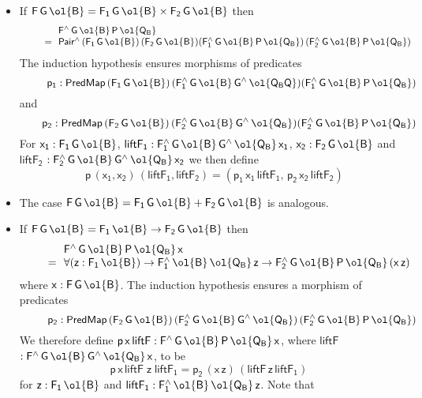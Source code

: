 \documentclass[sigplan,screen]{acmart}
\begin{document}
\begin{itemize}
\item 
If $\mathsf{F\,G\,\ol{B} = F_1\,G\,\ol{B} \times F_2\,G\,\ol{B}}$ then
\[\begin{array}{ll}
& \!\!\mathsf{F^{\wedge}\,G\,\ol{B}\,P\,\ol{Q_B}}\\
\quad\quad= & \!\!\mathsf{Pair^{\wedge}\,(F_1\,G\,\ol{B})\, (F_2\,G\,\ol{B})%
  (F_1^{\wedge}\,G\,\ol{B}\,P\,\ol{Q_B})\,
  (F_2^{\wedge}\,G\,\ol{B}\,P\,\ol{Q_B})}
  \end{array}\] The
induction hypothesis ensures
  morphisms of predicates
  \[\quad\quad\;\;\mathsf{p_1
  : PredMap\,(F_1\,G\,\ol{B})\,(F_1^{\wedge}\,G\,\ol{B}\,G^{\wedge}\,\ol{Q_BQ})
  (F_1^{\wedge}\,G\,\ol{B}\,P\,\ol{Q_B})}\] and \[\quad\quad\mathsf{p_2 :
  PredMap\,(F_2\,G\,\ol{B})\,(F_2^{\wedge}\,G\,\ol{B}\,G^{\wedge}\,\ol{Q_B})
  (F_2^{\wedge}\,G\,\ol{B}\,P\,\ol{Q_B})}\] For $\mathsf{x_1 :
  F_1\,G\,\ol{B}}$, $\mathsf{liftF_1 :
  F_1^{\wedge}\,G\,\ol{B}\,G^{\wedge}\,\ol{Q_B}\,x_1}$, $\mathsf{x_2 :
  F_2\,G\,\ol{B}}$ and $\mathsf{liftF_2}$ $\mathsf{:
  F_2^{\wedge}\,G\,\ol{B}\,G^{\wedge}\,\ol{Q_B}\,x_2}$ we then define
\[\quad\mathsf{p\, (x_1, x_2)\, (liftF_1, liftF_2) =
  (p_1\,x_1\,liftF_1,\, p_2\,x_2\,liftF_2)}\]
\item The case $\mathsf{F\,G\,\ol{B} = F_1\,G\,\ol{B} +
  F_2\,G\,\ol{B}}$ is analogous.
\item If $\mathsf{F\,G\,\ol{B} = F_1\,\ol{B} \to F_2\,G\,\ol{B}}$ then
  \[\begin{array}{ll}
  & \!\!\mathsf{F^{\wedge}\,G\,\ol{B}\,P\,\ol{Q_B}\,x}\\
  \quad\quad= & \!\!\mathsf{\forall (z :
  F_1\,\ol{B}) \to F_1^{\wedge}\,\ol{B}\,\ol{Q_B}\,z \to
  F_2^{\wedge}\,G\,\ol{B}\,P\,\ol{Q_B}\,(x\,z)}
  \end{array}\] where $\mathsf{x :
  F\,G\,\ol{B}}$. The induction hypothesis ensures
  a morphism of predicates
  \[\quad\quad\;\;\mathsf{p_2 : PredMap\,(F_2\,G\,\ol{B})\,
  (F_2^{\wedge}\,G\,\ol{B}\,G^{\wedge}\,\ol{Q_B})\,
  (F_2^{\wedge}\,G\,\ol{B}\,P\,\ol{Q_B})}\]  We therefore define
$\mathsf{p\,x\,liftF : F^{\wedge}\,G\,\ol{B}\,P\,\ol{Q_B}\,x}$, where
$\mathsf{liftF}$ $\mathsf{: F^{\wedge}\,G\,\ol{B}\,G^{\wedge}\,\ol{Q_B}\,x}$, to
be \[\mathsf{p\,x\,liftF\;z\;liftF_1 = p_2\, (x\,z)\,
  (liftF\,z\,liftF_1)}\] for $\mathsf{z : F_1\,\ol{B}}$ and
$\mathsf{liftF_1 : F_1^{\wedge}\,\ol{B}\,\ol{Q_B}\,z}$. Note that

\end{itemize}
\end{document}
